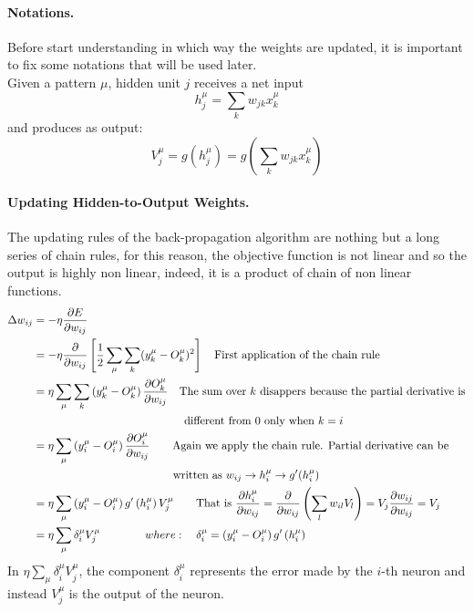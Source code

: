 \paragraph*{Notations.} Before start understanding in which way the weights are updated, it is important to fix some notations that will be used later.\\
Given a pattern $\mu$, hidden unit $j$ receives a net input
$$h _ { j } ^ { \mu } = \sum _ { k } w _ { j k } x _ { k } ^ { \mu }$$
and produces as output:
$$V _ { j } ^ { \mu } = g \left( h _ { j } ^ { \mu } \right) = g \left( \sum _ { k } w _ { j k } x _ { k } ^ { \mu } \right)$$

\paragraph*{Updating Hidden-to-Output Weights.} The updating rules of the back-propagation algorithm are nothing but a long series of chain rules, for this reason, the objective function is not linear and so the output is highly non linear, indeed, it is a product of chain of non linear functions.\\
\begin{equation} \notag
\begin{split}
\Delta w_{ij} &= -\eta \frac{\partial E}{\partial w_{ij}}\\
&= -\eta \frac{\partial}{\partial w_{ij}} \left[\frac{1}{2} \sum_{\mu} \sum_k (y_k^\mu - O_k^\mu)^2\right] \quad \text{First application of the chain rule}\\
&= \eta \sum _{\mu} \sum_{k} \left(y_{k}^{\mu} - O_{k}^{\mu} \right) \frac{\partial O_{k}^{\mu}} {\partial w_{ij}} \quad \text{The sum over } k \text{ disappers because the partial derivative is}\\
& \hspace*{13.5em} \text{different from 0 only when }k=i \\
&= \eta \sum_{\mu} \left(y_{i}^{\mu} - O_{i}^{\mu} \right) \frac{\partial O_{i}^{\mu}} {\partial w_{ij}} \qquad \text{Again we apply the chain rule. Partial derivative can be}\\
& \hspace*{12.5em} \text{written as } w_{ij} \rightarrow h_i^\mu \rightarrow g'(h_i^\mu)\\
&= \eta \sum _ { \mu } \left( y _ { i } ^ { \mu } - O _ { i } ^ { \mu } \right) g ^ { \prime } \left( h _ { i } ^ { \mu } \right) V _ { j } ^ { \mu } \qquad \text{That is } \frac{\partial h_i^\mu}{\partial w_{ij}} = \frac{\partial}{\partial w_{ij}}\left(\sum_l w_{il} V_l \right) = V_j \frac{\partial w_{ij}}{\partial w_{ij}} = V_j\\
&= \eta \sum _ { \mu } \delta _ { i } ^ { \mu } V _ { j } ^ { \mu } \qquad \qquad where: \quad \delta _ { i } ^ { \mu } = \left( y _ { i } ^ { \mu } - O _ { i } ^ { \mu } \right) g ^ { \prime } \left( h _ { i } ^ { \mu } \right)
\end{split}	
\end{equation}
In $\eta \sum_{\mu} \delta_{i}^{\mu} V_{j}^{\mu}$, the component $\delta_{i}^{\mu}$ represents the error made by the $i$-th neuron and instead $V_{j}^{\mu}$ is the output of the neuron.  

